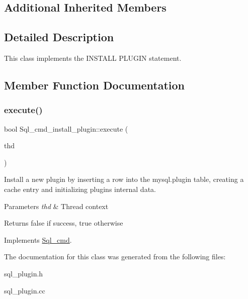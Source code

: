 \subsection*{Additional Inherited Members}


\subsection{Detailed Description}
This class implements the I\+N\+S\+T\+A\+LL P\+L\+U\+G\+IN statement. 

\subsection{Member Function Documentation}
\mbox{\label{classSql__cmd__install__plugin_a8e128952dea83f34e1293bd1f8e14b21}} 
\subsubsection{\texorpdfstring{execute()}{execute()}}
{\footnotesize\ttfamily bool Sql\+\_\+cmd\+\_\+install\+\_\+plugin\+::execute (\begin{DoxyParamCaption}\item[{T\+HD $\ast$}]{thd }\end{DoxyParamCaption})\hspace{0.3cm}{\ttfamily [virtual]}}

Install a new plugin by inserting a row into the mysql.\+plugin table, creating a cache entry and initializing plugin\textquotesingle{}s internal data.


\begin{DoxyParams}{Parameters}
{\em thd} & Thread context\\
\hline
\end{DoxyParams}
\begin{DoxyReturn}{Returns}
false if success, true otherwise 
\end{DoxyReturn}


Implements \mbox{\hyperlink{classSql__cmd_a213367b79b551296fbb7790f2a3732fb}{Sql\+\_\+cmd}}.



The documentation for this class was generated from the following files\+:\begin{DoxyCompactItemize}
\item 
sql\+\_\+plugin.\+h\item 
sql\+\_\+plugin.\+cc\end{DoxyCompactItemize}
